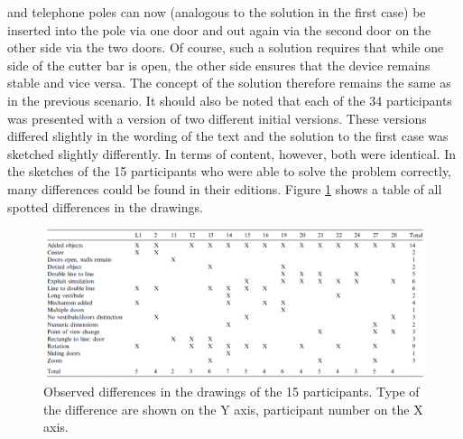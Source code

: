 \documentclass[12pt]{article}
\begin{document}
and telephone poles can now (analogous to the solution in the first case) be inserted into the pole via one door and out again via the second door on the other side via the two doors. Of course, such a solution requires that while one side of the cutter bar is open, the other side ensures that the device remains stable and vice versa. The concept of the solution therefore remains the same as in the previous scenario. It should also be noted that each of the 34 participants was presented with a version of two different initial versions. These versions differed slightly in the wording of the text and the solution to the first case was sketched slightly differently. In terms of content, however, both were identical. In the sketches of the 15 participants who were able to solve the problem correctly, many differences could be found in their editions. Figure \ref{fig:summary_differences} shows a table of all spotted differences in the drawings. 

\begin{figure}[H]
  \centering
  \includegraphics[width=\linewidth]{images/table_differences_of_solutions.PNG}
  \caption{\label{fig:summary_differences}Observed differences in the drawings of the 15 participants. Type of the difference are shown on the Y axis, participant number on the X axis.
}
  
\end{figure}     
\end{document}
